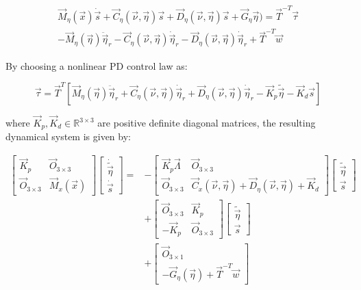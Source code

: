 \begin{sloppypar}
\begin{equation}
\begin{aligned}
\vec{M}_{\eta}(\vec{x})\dot{\vec{s}} + \vec{C}_{\eta}(\vec{\nu}, \vec{\eta})\vec{s} + \vec{D}_{\eta}(\vec{\nu}, \vec{\eta})\vec{s} + \vec{G}_{\eta}\vec{\eta}) = \vec{T}^{-T}\vec{\tau} \\
-\vec{M}_{\eta}(\vec{\eta})\ddot{\vec{\eta}}_r - \vec{C}_{\eta}(\vec{\nu}, \vec{\eta})\dot{\vec{\eta}}_r -  \vec{D}_{\eta}(\vec{\nu}, \vec{\eta})\dot{\vec{\eta}}_r + \vec{T}^{-T}\vec{w}
\end{aligned}
\end{equation}

By choosing a nonlinear PD control law as:

\begin{equation}
\vec{\tau} = \vec{T}^T\left[ \vec{M}_{\eta}(\vec{\eta})\ddot{\vec{\eta}}_r + \vec{C}_{\eta}(\vec{\nu}, \vec{\eta})\dot{\vec{\eta}}_r + \vec{D}_{\eta}(\vec{\nu}, \vec{\eta})\dot{\vec{\eta}}_r - \vec{K}_p\widetilde{\vec{\eta}} - \vec{K}_{d}\vec{s} \right]
\end{equation}

\noindent where $\vec{K}_p, \vec{K}_d\in\mathbb{R}^{3\times3}$ are positive definite diagonal matrices, the resulting dynamical system is given by:

\begin{equation} \label{eq:error_dynamics}
\begin{aligned}
\begin{bmatrix}
\vec{K}_p & \vec{O}_{3\times3} \\
\vec{O}_{3\times3} & \vec{M}_x(\vec{x})
\end{bmatrix} \begin{bmatrix}
\dot{\widetilde{\vec{\eta}}} \\
\dot{\vec{s}}
\end{bmatrix} = &-\begin{bmatrix}
\vec{K}_p\vec{\Lambda} & \vec{O}_{3\times3} \\
\vec{O}_{3\times3} & \vec{C}_x(\vec{\nu}, \vec{\eta}) + \vec{D}_{\eta}(\vec{\nu}, \vec{\eta}) + \vec{K}_d
\end{bmatrix} \begin{bmatrix}
\widetilde{\vec{\eta}}\\
\vec{s}
\end{bmatrix} \\
&+ \begin{bmatrix}
\vec{O}_{3\times3} & \vec{K}_p \\
-\vec{K}_p & \vec{O}_{3\times3}
\end{bmatrix} \begin{bmatrix}
\widetilde{\vec{\eta}}\\
\vec{s}
\end{bmatrix} \\
&+ \begin{bmatrix}
\vec{O}_{3\times1} \\
-\vec{G}_{\eta}(\vec{\eta}) + \vec{T}^{-T}\vec{w}
\end{bmatrix}
\end{aligned}
\end{equation}


\end{sloppypar}
